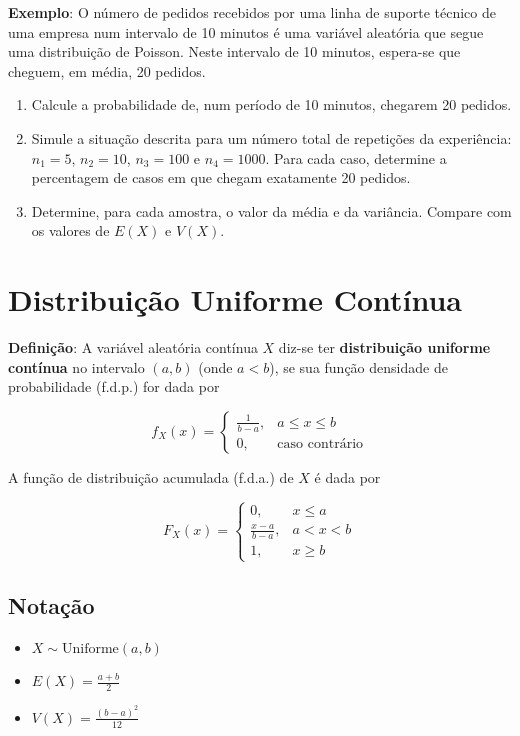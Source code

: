 \documentclass[
]{book}
\providecommand{\tightlist}{%
  \setlength{\itemsep}{0pt}\setlength{\parskip}{0pt}}
\begin{document}
\textbf{Exemplo}: O número de pedidos recebidos por uma linha de suporte
técnico de uma empresa num intervalo de 10 minutos é uma variável
aleatória que segue uma distribuição de Poisson. Neste intervalo de 10
minutos, espera-se que cheguem, em média, 20 pedidos.

\begin{enumerate}
\def\labelenumi{(\alph{enumi})}
\item
  Calcule a probabilidade de, num período de 10 minutos, chegarem 20
  pedidos.
\item
  Simule a situação descrita para um número total de repetições da
  experiência: \(n_1=5\), \(n_2=10\), \(n_3=100\) e \(n_4=1000\). Para cada
  caso, determine a percentagem de casos em que chegam exatamente 20
  pedidos.
\item
  Determine, para cada amostra, o valor da média e da variância.
  Compare com os valores de \(E(X)\) e \(V(X)\).
\end{enumerate}

\section{Distribuição Uniforme Contínua}\label{distribuiuxe7uxe3o-uniforme-contuxednua}

\textbf{Definição}: A variável aleatória contínua \(X\) diz-se ter \textbf{distribuição uniforme contínua} no intervalo \((a, b)\) (onde \(a < b\)), se sua função densidade de probabilidade (f.d.p.) for dada por

\[
f_{X}(x) = \begin{cases} 
\frac{1}{b - a}, & a \leq x \leq b \\ 
0, & \text{caso contrário} 
\end{cases}
\]

A função de distribuição acumulada (f.d.a.) de \(X\) é dada por

\[
F_{X}(x) = \begin{cases} 
0, & x \leq a \\ 
\frac{x - a}{b - a}, & a < x < b \\ 
1, & x \geq b 
\end{cases}
\]

\subsection{Notação}\label{notauxe7uxe3o}

\begin{itemize}
\tightlist
\item
  \(X \sim \text{Uniforme}(a, b)\)
\item
  \(E(X) = \frac{a + b}{2}\)
\item
  \(V(X) = \frac{(b - a)^2}{12}\)
\end{itemize}
\end{document}
